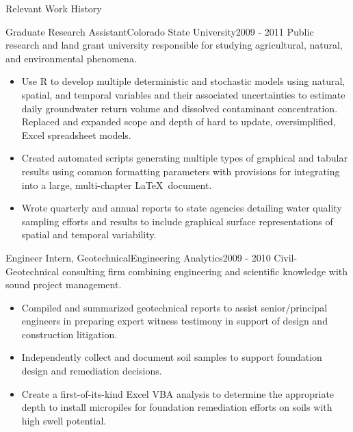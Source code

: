 \documentclass[]{mcdowellcv}
\begin{document}
\begin{cvsection}{Relevant Work History}
		\begin{cvsubsection}{Graduate Research Assistant}{Colorado State University}{2009 - 2011}
			Public research and land grant university responsible for studying agricultural, natural, and environmental phenomena.
			\vspace{5pt}
			\begin{itemize}
				\item Use \textsf{R} to develop multiple deterministic and stochastic models using natural, spatial, and temporal variables and their associated uncertainties to estimate daily groundwater return volume and dissolved contaminant concentration.  Replaced and expanded scope and depth of hard to update, oversimplified, Excel spreadsheet models.
				\\
				\item Created automated scripts generating multiple types of graphical and tabular results using common formatting parameters with provisions for integrating into a large, multi-chapter \LaTeX\ document.
				\\
				\item Wrote quarterly and annual reports to state agencies detailing water quality sampling efforts and results to include graphical surface representations of spatial and temporal variability.
			\end{itemize}
		\end{cvsubsection}
		
		\begin{cvsubsection}{Engineer Intern, Geotechnical}{Engineering Analytics}{2009 - 2010}
			Civil-Geotechnical consulting firm combining engineering and scientific knowledge with sound project management.
			\vspace{5pt}
			\begin{itemize}
				\item Compiled and summarized geotechnical reports to assist senior/principal engineers in preparing expert witness testimony in support of design and construction litigation.
				\\
				\item Independently collect and document soil samples to support foundation design and remediation decisions. 
				\\
				\item Create a first-of-its-kind Excel VBA analysis to determine the appropriate depth to install micropiles for foundation remediation efforts on soils with high swell potential.
			\end{itemize}
		\end{cvsubsection}
	\end{cvsection}
\end{document}
